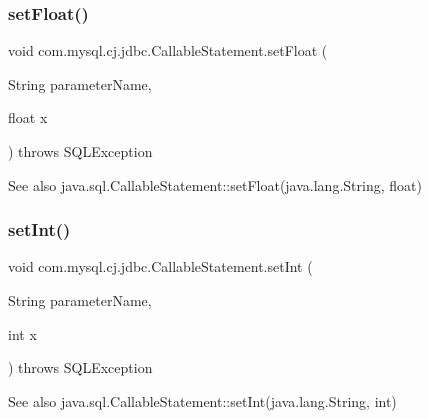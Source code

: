 \subsubsection{\texorpdfstring{set\+Float()}{setFloat()}}
{\footnotesize\ttfamily void com.\+mysql.\+cj.\+jdbc.\+Callable\+Statement.\+set\+Float (\begin{DoxyParamCaption}\item[{String}]{parameter\+Name,  }\item[{float}]{x }\end{DoxyParamCaption}) throws S\+Q\+L\+Exception}

\begin{DoxySeeAlso}{See also}
java.\+sql.\+Callable\+Statement\+::set\+Float(java.\+lang.\+String, float) 
\end{DoxySeeAlso}
\mbox{\label{classcom_1_1mysql_1_1cj_1_1jdbc_1_1_callable_statement_a7b7f13ec6ca2fe9dc40472b5334d1259}} 
\subsubsection{\texorpdfstring{set\+Int()}{setInt()}}
{\footnotesize\ttfamily void com.\+mysql.\+cj.\+jdbc.\+Callable\+Statement.\+set\+Int (\begin{DoxyParamCaption}\item[{String}]{parameter\+Name,  }\item[{int}]{x }\end{DoxyParamCaption}) throws S\+Q\+L\+Exception}

\begin{DoxySeeAlso}{See also}
java.\+sql.\+Callable\+Statement\+::set\+Int(java.\+lang.\+String, int) 
\end{DoxySeeAlso}
\mbox{\label{classcom_1_1mysql_1_1cj_1_1jdbc_1_1_callable_statement_a1b79292eddc7df78b2ef1b7e9ea614ed}} 
